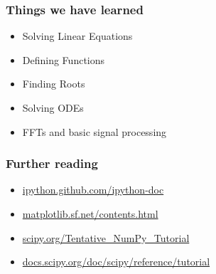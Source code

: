 \documentclass[14pt,compress]{beamer}
\begin{document}
\begin{frame}
  \frametitle{Things we have learned}
  \begin{itemize}
  \item Solving Linear Equations
  \item Defining Functions
  \item Finding Roots
  \item Solving ODEs
  \item FFTs and basic signal processing
  \end{itemize}
\end{frame}


\begin{frame}
    \frametitle{Further reading}
    \begin{itemize}
        \item \url{ipython.github.com/ipython-doc}
        \item \url{matplotlib.sf.net/contents.html}
        \item \url{scipy.org/Tentative_NumPy_Tutorial}
        \item \url{docs.scipy.org/doc/scipy/reference/tutorial}
    \end{itemize}
\end{frame}
\end{document}
